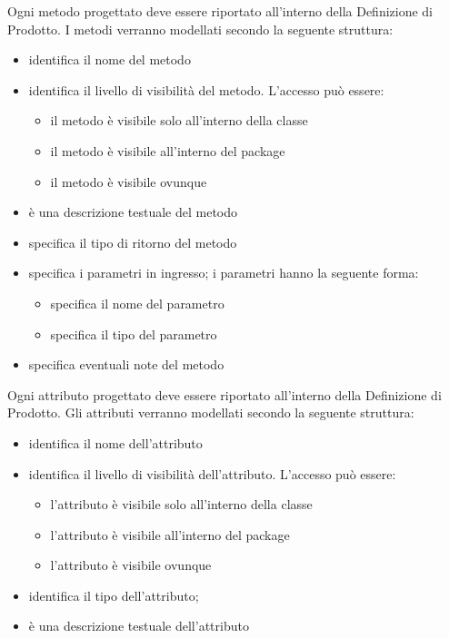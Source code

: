Ogni metodo progettato deve essere riportato all'interno della Definizione di Prodotto. I metodi verranno modellati secondo la seguente struttura:
\begin{itemize}
\item {}identifica il nome del metodo
\item {}identifica il livello di visibilità del metodo. L'accesso può essere:
	\begin{itemize}
	\item {}il metodo è visibile solo all'interno della classe
	\item {}il metodo è visibile all'interno del package
	\item {}il metodo è visibile ovunque
	\end{itemize}
\item {}è una descrizione testuale del metodo
\item {}specifica il tipo di ritorno del metodo
\item {}specifica i parametri in ingresso; i parametri hanno la seguente forma:
	\begin{itemize}
	\item {}specifica il nome del parametro
	\item {}specifica il tipo del parametro
	\end{itemize}
\item {}specifica eventuali note del metodo
\end{itemize}

Ogni attributo progettato deve essere riportato all'interno della Definizione di Prodotto. Gli attributi verranno modellati secondo la seguente struttura:
\begin{itemize}
\item {}identifica il nome dell'attributo
\item {}identifica il livello di visibilità dell'attributo. L'accesso può essere:
	\begin{itemize}
	\item {}l'attributo è visibile solo all'interno della classe
	\item {}l'attributo è visibile all'interno del package
	\item {}l'attributo è visibile ovunque
	\end{itemize}
\item {}identifica il tipo dell'attributo;
\item {}è una descrizione testuale dell'attributo
\end{itemize}

